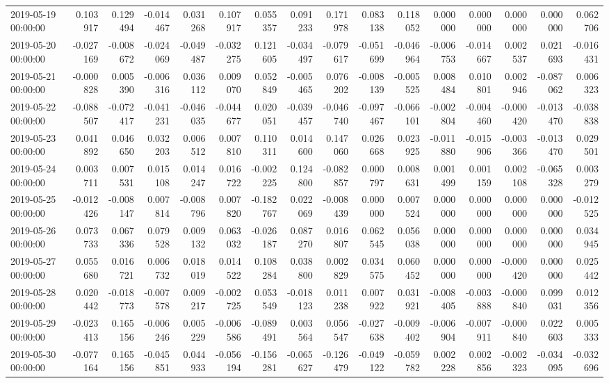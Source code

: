 \begin{tabular}{lrrrrrrrrrrrrrrr}
2019-05-19 00:00:00 & 0.103917 & 0.129494 & -0.014467 & 0.031268 & 0.107917 & 0.055357 & 0.091233 & 0.171978 & 0.083138 & 0.118052 & 0.000000 & 0.000000 & 0.000000 & 0.000000 & 0.062706 \\
2019-05-20 00:00:00 & -0.027169 & -0.008672 & -0.024069 & -0.049487 & -0.032275 & 0.121605 & -0.034497 & -0.079617 & -0.051699 & -0.046964 & -0.006753 & -0.014667 & 0.002537 & 0.021693 & -0.016431 \\
2019-05-21 00:00:00 & -0.000828 & 0.005390 & -0.006316 & 0.036112 & 0.009070 & 0.052849 & -0.005465 & 0.076202 & -0.008139 & -0.005525 & 0.008484 & 0.010801 & 0.002946 & -0.087062 & 0.006323 \\
2019-05-22 00:00:00 & -0.088507 & -0.072417 & -0.041231 & -0.046035 & -0.044677 & 0.020051 & -0.039457 & -0.046740 & -0.097467 & -0.066101 & -0.002804 & -0.004460 & -0.000420 & -0.013470 & -0.038838 \\
2019-05-23 00:00:00 & 0.041892 & 0.046650 & 0.032203 & 0.006512 & 0.007810 & 0.110311 & 0.014600 & 0.147060 & 0.026668 & 0.023925 & -0.011880 & -0.015906 & -0.003366 & -0.013470 & 0.029501 \\
2019-05-24 00:00:00 & 0.003711 & 0.007531 & 0.015108 & 0.014247 & 0.016722 & -0.002225 & 0.124800 & -0.082857 & 0.000797 & 0.008631 & 0.001499 & 0.001159 & 0.002108 & -0.065328 & 0.003279 \\
2019-05-25 00:00:00 & -0.012426 & -0.008147 & 0.007814 & -0.008796 & 0.007820 & -0.182767 & 0.022069 & -0.008439 & 0.000000 & 0.007524 & 0.000000 & 0.000000 & 0.000000 & 0.000000 & -0.012525 \\
2019-05-26 00:00:00 & 0.073733 & 0.067336 & 0.079528 & 0.009132 & 0.063032 & -0.026187 & 0.087270 & 0.016807 & 0.062545 & 0.056038 & 0.000000 & 0.000000 & 0.000000 & 0.000000 & 0.034945 \\
2019-05-27 00:00:00 & 0.055680 & 0.016721 & 0.006732 & 0.018019 & 0.014522 & 0.108284 & 0.038800 & 0.002829 & 0.034575 & 0.060452 & 0.000000 & 0.000000 & -0.000420 & 0.000000 & 0.025442 \\
2019-05-28 00:00:00 & 0.020442 & -0.018773 & -0.007578 & 0.009217 & -0.002725 & 0.053549 & -0.018123 & 0.011238 & 0.007922 & 0.031921 & -0.008405 & -0.003888 & -0.000840 & 0.099031 & 0.012356 \\
2019-05-29 00:00:00 & -0.023413 & 0.165156 & -0.006246 & 0.005229 & -0.006586 & -0.089491 & 0.003564 & 0.056547 & -0.027638 & -0.009402 & -0.006904 & -0.007911 & -0.000840 & 0.022603 & 0.005333 \\
2019-05-30 00:00:00 & -0.077164 & 0.165156 & -0.045851 & 0.044933 & -0.056194 & -0.156281 & -0.065627 & -0.126479 & -0.049122 & -0.059782 & 0.002228 & 0.002856 & -0.002323 & -0.034095 & -0.032696 \\

\end{tabular}
